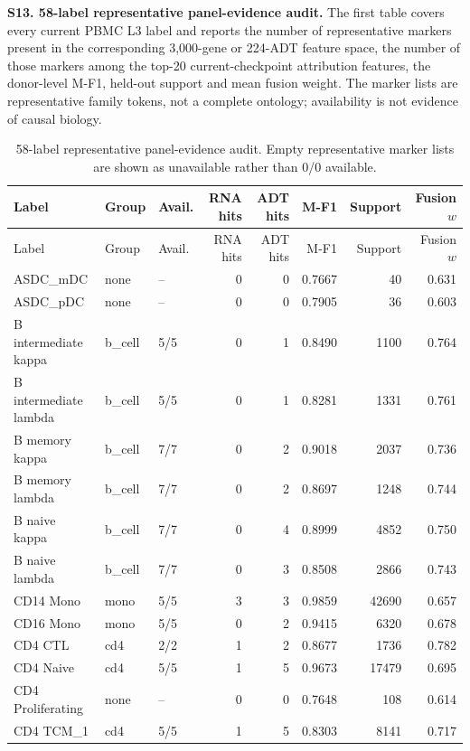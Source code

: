 \noindent\textbf{S13. 58-label representative panel-evidence audit.}
The first table covers every current PBMC L3 label and reports the number of representative markers present in the corresponding 3,000-gene or 224-ADT feature space, the number of those markers among the top-20 current-checkpoint attribution features, the donor-level M-F1, held-out support and mean fusion weight. The marker lists are representative family tokens, not a complete ontology; availability is not evidence of causal biology.

\scriptsize
\begin{longtable}{@{}p{2.2cm}p{1.0cm}p{0.9cm}rrrrr@{}}
\caption{58-label representative panel-evidence audit. Empty representative marker lists are shown as unavailable rather than 0/0 available.}\label{tab:marker-mechanism}\\
\toprule
Label & Group & Avail. & RNA hits & ADT hits & M-F1 & Support & Fusion $w$ \\
\midrule
\endfirsthead
\toprule
Label & Group & Avail. & RNA hits & ADT hits & M-F1 & Support & Fusion $w$ \\
\midrule
\endhead
ASDC\_mDC & none & -- & 0 & 0 & 0.7667 & 40 & 0.631 \\
ASDC\_pDC & none & -- & 0 & 0 & 0.7905 & 36 & 0.603 \\
B intermediate kappa & b\_cell & 5/5 & 0 & 1 & 0.8490 & 1100 & 0.764 \\
B intermediate lambda & b\_cell & 5/5 & 0 & 1 & 0.8281 & 1331 & 0.761 \\
B memory kappa & b\_cell & 7/7 & 0 & 2 & 0.9018 & 2037 & 0.736 \\
B memory lambda & b\_cell & 7/7 & 0 & 2 & 0.8697 & 1248 & 0.744 \\
B naive kappa & b\_cell & 7/7 & 0 & 4 & 0.8999 & 4852 & 0.750 \\
B naive lambda & b\_cell & 7/7 & 0 & 3 & 0.8508 & 2866 & 0.743 \\
CD14 Mono & mono & 5/5 & 3 & 3 & 0.9859 & 42690 & 0.657 \\
CD16 Mono & mono & 5/5 & 0 & 2 & 0.9415 & 6320 & 0.678 \\
CD4 CTL & cd4 & 2/2 & 1 & 2 & 0.8677 & 1736 & 0.782 \\
CD4 Naive & cd4 & 5/5 & 1 & 5 & 0.9673 & 17479 & 0.695 \\
CD4 Proliferating & none & -- & 0 & 0 & 0.7648 & 108 & 0.614 \\
CD4 TCM\_1 & cd4 & 5/5 & 1 & 5 & 0.8303 & 8141 & 0.717 \\

\end{longtable}
